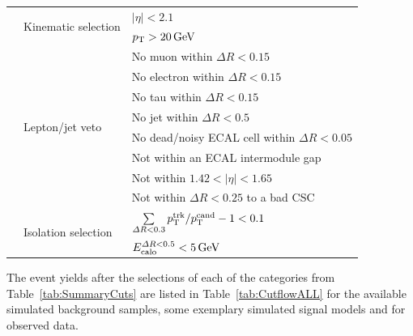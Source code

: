 \begin{table}[!h]
{\begin{tabular}{l|l|l}
                                                              &  \multirow{2}{*}{Kinematic selection}      & $|\eta|<2.1$ \\
                                                              &                                            & $p_{\text{T}}>20\,\text{Ge}\kern-0.06667em\text{V}$ \\\cmidrule{2-3}

                                                              &  \multirow{8}{*}{Lepton/jet veto}          & No muon within $\Delta R<0.15$ \\
                                                              &                                            & No electron within $\Delta R<0.15$ \\
                                                              &                                            & No tau within $\Delta R<0.15$ \\
                                                              &                                            & No jet within $\Delta R<0.5$ \\
                                                              &                                            & No dead/noisy ECAL cell within $\Delta R<0.05$  \\
                                                              &                                            & Not within an ECAL intermodule gap  \\
                                                              &                                            & Not within $1.42<|\eta|<1.65$ \\
                                                              &                                            & Not within $\Delta R<0.25$ to a bad CSC \\\cmidrule{2-3}

                                                              &  \multirow{2}{*}{Isolation selection}      & $\sum \limits_{\Delta R < 0.3} p_{\text{T}}^{\text{trk}}/p_{\text{T}}^{\text{cand}} -1  < 0.1$ \\
                                                              &                                            & $E^{\Delta R<0.5}_{\text{calo}}<5\,\text{Ge}\kern-0.06667em\text{V}$ \\


\bottomrule
\end{tabular}}
\end{table}
The event yields after the selections of each of the categories from Table~\ref{tab:SummaryCuts} are listed in Table~\ref{tab:CutflowALL} for the available simulated background samples, some exemplary simulated signal models and for observed data.
